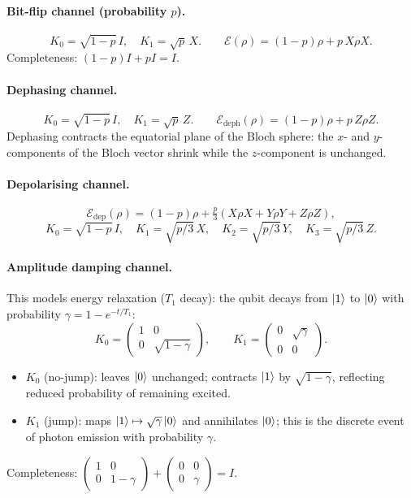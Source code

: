 \documentclass[11pt, a4paper]{article}
\theoremstyle{definition}
\theoremstyle{plain}
\theoremstyle{remark}
\begin{document}
\paragraph{Bit-flip channel (probability $p$).}
\[
  K_0 = \sqrt{1-p}\, I, \quad K_1 = \sqrt{p}\, X. \qquad
  \mathcal{E}(\rho) = (1-p)\rho + p\,X\rho X.
\]
Completeness: $(1-p)I + pI = I$.\;\checkmark

\paragraph{Dephasing channel.}
\[
  K_0 = \sqrt{1-p}\, I, \quad K_1 = \sqrt{p}\, Z. \qquad
  \mathcal{E}_{\mathrm{deph}}(\rho) = (1-p)\rho + p\,Z\rho Z.
\]
Dephasing contracts the equatorial plane of the Bloch sphere: the $x$- and
$y$-components of the Bloch vector shrink while the $z$-component is
unchanged.

\paragraph{Depolarising channel.}
\[
  \mathcal{E}_{\mathrm{dep}}(\rho)
  = (1-p)\rho + \tfrac{p}{3}(X\rho X + Y\rho Y + Z\rho Z),
\]
\[
  K_0 = \sqrt{1-p}\,I,\quad
  K_1 = \sqrt{p/3}\,X,\quad
  K_2 = \sqrt{p/3}\,Y,\quad
  K_3 = \sqrt{p/3}\,Z.
\]

\paragraph{Amplitude damping channel.}
This models energy relaxation ($T_1$ decay): the qubit decays from
$\ket{1}$ to $\ket{0}$ with probability $\gamma = 1 - e^{-t/T_1}$:
\[
  K_0 = \begin{pmatrix}1&0\\0&\sqrt{1-\gamma}\end{pmatrix},\qquad
  K_1 = \begin{pmatrix}0&\sqrt{\gamma}\\0&0\end{pmatrix}.
\]
\begin{itemize}
  \item $K_0$ (no-jump): leaves $\ket{0}$ unchanged; contracts $\ket{1}$
        by $\sqrt{1-\gamma}$, reflecting reduced probability of remaining
        excited.
  \item $K_1$ (jump): maps $\ket{1}\mapsto\sqrt{\gamma}\ket{0}$ and
        annihilates $\ket{0}$; this is the discrete event of photon
        emission with probability $\gamma$.
\end{itemize}
Completeness:
$\begin{pmatrix}1&0\\0&1-\gamma\end{pmatrix}
+\begin{pmatrix}0&0\\0&\gamma\end{pmatrix} = I$.\;\checkmark
\end{document}
